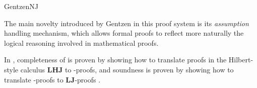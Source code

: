 \begin{entry}{GentzenNJ}
\begin{history}
The main novelty introduced by Gentzen in this proof system is its 
\emph{assumption} handling mechanism, which allows formal proofs to reflect 
more naturally the logical reasoning involved in mathematical proofs.
\end{history}

\newcommand{\LHJ}{\ensuremath{\mathbf{LHJ}}\xspace}

\begin{technicalities}
In \cite{Gentzen1935}, completeness of \NJ is proven by showing how to translate proofs in the Hilbert-style calculus \LHJ {} to \NJ-proofs, and soundness is proven by showing how to translate \NJ-proofs to $\mathbf{LJ}$-proofs .
\end{technicalities}


\end{entry}
